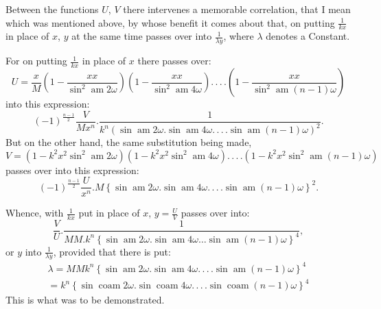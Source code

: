 \documentclass{article}
\begin{document}
Between the functions $U$, $V$ there intervenes a memorable correlation, that I mean which was mentioned above, by whose benefit it comes about that, on putting $\frac{1}{kx}$ in place of $x$, $y$ at the same time passes over into $\frac{1}{\lambda y}$, where $\lambda$ denotes a Constant.

For on putting $\frac{1}{kx}$ in place of $x$ there passes over:
\[
U=\frac{x}{M}\left(1-\frac{xx}{\sin^{2}\operatorname{am}2\omega}\right)\left(1-\frac{xx}{\sin^{2}\operatorname{am}4\omega}\right).\,.\,.\,.\left(1-\frac{xx}{\sin^{2}\operatorname{am}(n-1)\omega}\right)
\]
into this expression:
\[
(-1)^{\frac{n-1}{2}}\frac{V}{Mx^{n}}.\frac{1}{k^{n}\left(\sin\operatorname{am}2\omega.\sin\operatorname{am}4\omega.\,.\,.\,.\sin\operatorname{am}(n-1)\omega\right)^{2}}.
\]
But on the other hand, the same substitution being made,
\[
V=\left(1-k^{2}x^{2}\sin^{2}\operatorname{am}2\omega\right)\left(1-k^{2}x^{2}\sin^{2}\operatorname{am}4\omega\right).\,.\,.\,.\left(1-k^{2}x^{2}\sin^{2}\operatorname{am}(n-1)\omega\right)
\]
passes over into this expression:
\[
(-1)^{\frac{n-1}{2}}\frac{U}{x^{n}}.M\left\{\sin\operatorname{am}2\omega.\sin\operatorname{am}4\omega.\,.\,.\,.\sin\operatorname{am}(n-1)\omega\right\}^{2}.
\]

Whence, with $\frac{1}{kx}$ put in place of $x$, $y=\frac{U}{V}$ passes over into:
\[
\frac{V}{U}.\frac{1}{MM.k^{n}\left\{\sin\operatorname{am}2\omega.\sin\operatorname{am}4\omega\ldots\sin\operatorname{am}(n-1)\omega\right\}^{4}},
\]
or $y$ into $\frac{1}{\lambda y}$, provided that there is put:
\[
\begin{gathered}
\lambda=MMk^{n}\left\{\sin\operatorname{am}2\omega.\sin\operatorname{am}4\omega.\,.\,.\,.\sin\operatorname{am}(n-1)\omega\right\}^{4}\\[1.5ex]
=k^{n}\left\{\sin\operatorname{coam}2\omega.\sin\operatorname{coam}4\omega.\,.\,.\,.\sin\operatorname{coam}(n-1)\omega\right\}^{4}
\end{gathered}
\]
This is what was to be demonstrated.
\end{document}
